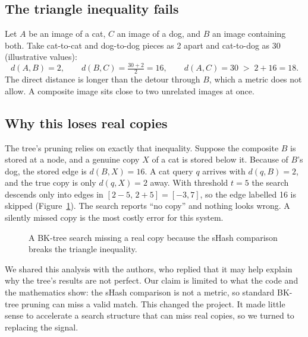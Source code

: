 \subsection{The triangle inequality fails}

Let $A$ be an image of a cat, $C$ an image of a dog, and $B$ an image containing both. Take
cat-to-cat and dog-to-dog pieces as 2 apart and cat-to-dog as 30 (illustrative values):
\[
  d(A,B) = 2, \qquad d(B,C) = \tfrac{30+2}{2} = 16, \qquad d(A,C) = 30 \;>\; 2 + 16 = 18.
\]
The direct distance is longer than the detour through $B$, which a metric does not allow. A
composite image sits close to two unrelated images at once.

\subsection{Why this loses real copies}

The tree's pruning relies on exactly that inequality. Suppose the composite $B$ is stored at
a node, and a genuine copy $X$ of a cat is stored below it. Because of $B$'s dog, the stored
edge is $d(B,X)=16$. A cat query $q$ arrives with $d(q,B)=2$, and the true copy is only
$d(q,X)=2$ away. With threshold $t=5$ the search descends only into edges in
$[2-5,\,2+5]=[-3,7]$, so the edge labelled 16 is skipped (Figure~\ref{fig:prune}). The search
reports ``no copy'' and nothing looks wrong. A silently missed copy is the most costly error
for this system.

\begin{figure}[ht]
\centering
{}
\caption{A BK-tree search missing a real copy because the sHash comparison breaks the triangle
inequality.}
\label{fig:prune}
\end{figure}

We shared this analysis with the authors, who replied that it may help explain why the tree's
results are not perfect. Our claim is limited to what the code and the mathematics show: the sHash
comparison is not a metric, so standard BK-tree pruning can miss a valid match. This changed
the project. It made little sense to accelerate a search structure that can miss real copies,
so we turned to replacing the signal.

